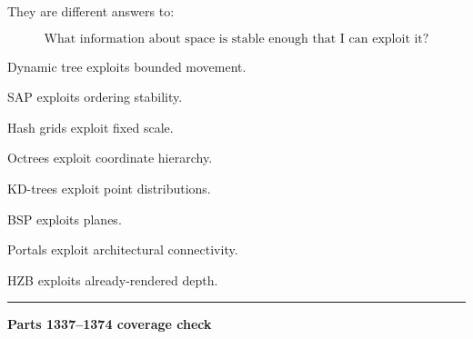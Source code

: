 They are different answers to:

\[
\boxed{
\text{What information about space is stable enough that I can exploit it?}
}
\]

Dynamic tree exploits bounded movement.

SAP exploits ordering stability.

Hash grids exploit fixed scale.

Octrees exploit coordinate hierarchy.

KD-trees exploit point distributions.

BSP exploits planes.

Portals exploit architectural connectivity.

HZB exploits already-rendered depth.

\begin{center}\rule{0.5\linewidth}{0.5pt}\end{center}

\textbf{Parts 1337--1374 coverage check}

